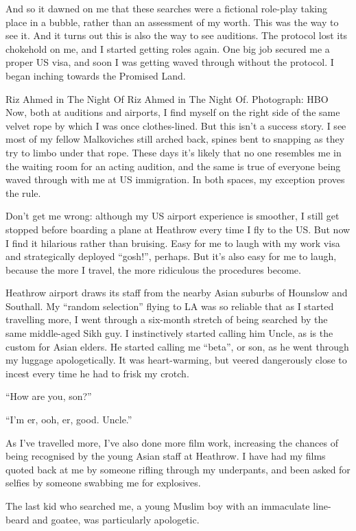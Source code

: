 \documentclass[10pt,a4paper]{article}
\begin{document}
And so it dawned on me that these searches were a fictional role-play taking place in a bubble, rather than an assessment of my worth. This was the way to see it. And it turns out this is also the way to see auditions. The protocol lost its chokehold on me, and I started getting roles again. One big job secured me a proper US visa, and soon I was getting waved through without the protocol. I began inching towards the Promised Land.

Riz Ahmed in The Night Of
Riz Ahmed in The Night Of. Photograph: HBO
Now, both at auditions and airports, I find myself on the right side of the same velvet rope by which I was once clothes-lined. But this isn’t a success story. I see most of my fellow Malkoviches still arched back, spines bent to snapping as they try to limbo under that rope. These days it’s likely that no one resembles me in the waiting room for an acting audition, and the same is true of everyone being waved through with me at US immigration. In both spaces, my exception proves the rule.

Don’t get me wrong: although my US airport experience is smoother, I still get stopped before boarding a plane at Heathrow every time I fly to the US. But now I find it hilarious rather than bruising. Easy for me to laugh with my work visa and strategically deployed “gosh!”, perhaps. But it’s also easy for me to laugh, because the more I travel, the more ridiculous the procedures become.

Heathrow airport draws its staff from the nearby Asian suburbs of Hounslow and Southall. My “random selection” flying to LA was so reliable that as I started travelling more, I went through a six-month stretch of being searched by the same middle-aged Sikh guy. I instinctively started calling him Uncle, as is the custom for Asian elders. He started calling me “beta”, or son, as he went through my luggage apologetically. It was heart-warming, but veered dangerously close to incest every time he had to frisk my crotch.

“How are you, son?”

“I’m er, ooh, er, good. Uncle.”

As I’ve travelled more, I’ve also done more film work, increasing the chances of being recognised by the young Asian staff at Heathrow. I have had my films quoted back at me by someone rifling through my underpants, and been asked for selfies by someone swabbing me for explosives.

The last kid who searched me, a young Muslim boy with an immaculate line-beard and goatee, was particularly apologetic.
\end{document}
